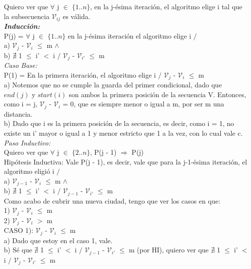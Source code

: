 \documentclass{article}
\theoremstyle{definition}
\theoremstyle{remark}
\begin{document}
Quiero ver que $\forall$ j $\in$ $\{1..n\}$, en la j-ésima iteración, el algoritmo elige i tal que la subsecuencia $\mathcal{V}_{ij}$ es válida.\\

\textbf{\textit{Inducción:}} \\

P(j) = $\forall$ j $\in$ $\{1..n\}$ en la j-ésima iteración el algoritmo elige i $/$ \\
a) $\mathcal{V}_j$ -  $\mathcal{V}_i$ $\leq$ m $\wedge$ \\
b) $\nexists$ 1 $\leq$ i' $<$ i $/$ $\mathcal{V}_j$ - $\mathcal{V}_{i'}$ $\leq$ m \\

\textit{Caso Base:} \\
P(1) = En la primera iteración, el algoritmo elige i $/$ $\mathcal{V}_j$ - $\mathcal{V}_i$ $\leq$ m \\

a) Notemos que no se cumple la guarda del primer condicional, dado que $end(j)$ y $start(i)$ son ambos la primera posición de la secuencia V. Entonces, como i = j, $\mathcal{V}_j$ -  $\mathcal{V}_i$ = 0, que es siempre menor o igual a m, por ser m una distancia. \\

b) Dado que i es la primera posición de la secuencia, es decir, como i = 1, no existe un i' mayor o igual a 1 y menor estricto que 1 a la vez, con lo cual vale c.\\

\textit{Paso Inductivo:} \\
Quiero ver que $\forall$ j $\in$ $\{2..n\}$, P(j - 1) $\Rightarrow$ P(j) \\ 
Hipótesis Inductiva: Vale P(j - 1), es decir, vale que para la j-1-ésima iteración, el algoritmo eligió i $/$ \\
a) $\mathcal{V}_{j-1}$ - $\mathcal{V}_i$ $\leq$ m $\wedge$ \\
b) $\nexists$ 1 $\leq$ i' $<$ i $/$ $\mathcal{V}_{j-1}$ - $\mathcal{V}_{i'}$ $\leq$ m \\

Como acabo de cubrir una nueva ciudad, tengo que ver los casos en que:\\
1) $\mathcal{V}_j$ - $\mathcal{V}_i$ $\leq$ m \\
2) $\mathcal{V}_j$ - $\mathcal{V}_i$ $>$ m \\

CASO 1): $\mathcal{V}_j$ - $\mathcal{V}_i$ $\leq$ m \\
a) Dado que estoy en el caso 1, vale.\\
b) Sé que $\nexists$ 1 $\leq$ i' $<$ i $/$ $\mathcal{V}_{j-1}$ - $\mathcal{V}_{i'}$ $\leq$ m (por HI), quiero ver que $\nexists$ 1 $\leq$ i' $<$ i $/$ $\mathcal{V}_j$ - $\mathcal{V}_{i'}$ $\leq$ m \\
\end{document}
